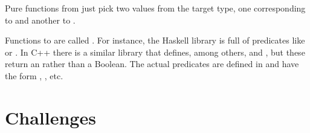 Pure functions from  just pick two values from the target
type, one corresponding to  and another to .

Functions to  are called . For instance,
the Haskell library  is full of predicates like
 or . In C++ there is a similar library
\code{} that defines, among others,  and
, but these return an  rather than a
Boolean. The actual predicates are defined in  and
have the form ,
, etc.

\section{Challenges}

